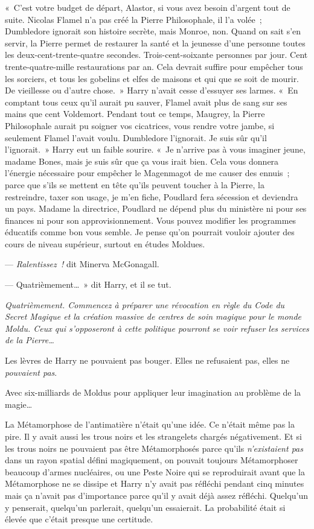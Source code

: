 «~C'est votre budget de départ, Alastor, si vous avez besoin d'argent tout de suite. Nicolas Flamel n'a pas créé la Pierre Philosophale, il l'a volée~; Dumbledore ignorait son histoire secrète, mais Monroe, non. Quand on sait s'en servir, la Pierre permet de restaurer la santé et la jeunesse d'une personne toutes les deux-cent-trente-quatre secondes. Trois-cent-soixante personnes par jour. Cent trente-quatre-mille restaurations par an. Cela devrait suffire pour empêcher tous les sorciers, et tous les gobelins et elfes de maisons et qui que se soit de mourir. De vieillesse ou d'autre chose.~» Harry n'avait cesse d'essuyer ses larmes. «~En comptant tous ceux qu'il aurait pu sauver, Flamel avait plus de sang sur ses mains que cent Voldemort. Pendant tout ce temps, Maugrey, la Pierre Philosophale aurait pu soigner vos cicatrices, vous rendre votre jambe, si seulement Flamel l'avait voulu. Dumbledore l'ignorait. Je suis sûr qu'il l'ignorait.~» Harry eut un faible sourire. «~Je n'arrive pas à vous imaginer jeune, madame Bones, mais je suis sûr que ça vous irait bien. Cela vous donnera l'énergie nécessaire pour empêcher le Magenmagot de me causer des ennuis~; parce que s'ils se mettent en tête qu'ils peuvent toucher à la Pierre, la restreindre, taxer son usage, je m'en fiche, Poudlard fera sécession et deviendra un pays. Madame la directrice, Poudlard ne dépend plus du ministère ni pour ses finances ni pour son approvisionnement. Vous pouvez modifier les programmes éducatifs comme bon vous semble. Je pense qu'on pourrait vouloir ajouter des cours de niveau supérieur, surtout en études Moldues.

--- \emph{Ralentissez~!} dit Minerva McGonagall.

--- Quatrièmement…~» dit Harry, et il se tut.

\emph{Quatrièmement. Commencez à préparer une révocation en règle du Code du Secret Magique et la création massive de centres de soin magique pour le monde Moldu. Ceux qui s'opposeront à cette politique pourront se voir refuser les services de la Pierre…}

Les lèvres de Harry ne pouvaient pas bouger. Elles ne refusaient pas, elles ne \emph{pouvaient pas}.

Avec six-milliards de Moldus pour appliquer leur imagination au problème de la magie…

La Métamorphose de l'antimatière n'était qu'une idée. Ce n'était même pas la pire. Il y avait aussi les trous noirs et les strangelets chargés négativement. Et si les trous noirs ne pouvaient pas être Métamorphosés parce qu'ils \emph{n'existaient pas} dans un rayon spatial défini magiquement, on pouvait toujours Métamorphoser beaucoup d'armes nucléaires, ou une Peste Noire qui se reproduirait avant que la Métamorphose ne se dissipe et Harry n'y avait pas réfléchi pendant cinq minutes mais ça n'avait pas d'importance parce qu'il y avait déjà assez réfléchi. Quelqu'un y penserait, quelqu'un parlerait, quelqu'un essaierait. La probabilité était si élevée que c'était presque une certitude.

